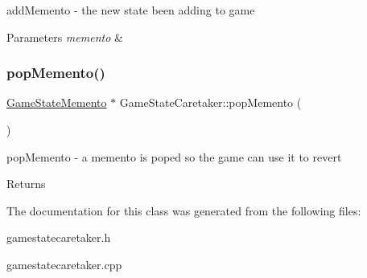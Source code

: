 add\+Memento -\/ the new state been adding to game 


\begin{DoxyParams}{Parameters}
{\em memento} & \\
\hline
\end{DoxyParams}
\mbox{\label{class_game_state_caretaker_a7f9344fa69b23a93da6d9ba345351d1b}} 
\subsubsection{\texorpdfstring{pop\+Memento()}{popMemento()}}
{\footnotesize\ttfamily \mbox{\hyperlink{class_game_state_memento}{Game\+State\+Memento}} $\ast$ Game\+State\+Caretaker\+::pop\+Memento (\begin{DoxyParamCaption}{ }\end{DoxyParamCaption})}



pop\+Memento -\/ a memento is poped so the game can use it to revert 

\begin{DoxyReturn}{Returns}

\end{DoxyReturn}


The documentation for this class was generated from the following files\+:\begin{DoxyCompactItemize}
\item 
gamestatecaretaker.\+h\item 
gamestatecaretaker.\+cpp\end{DoxyCompactItemize}
